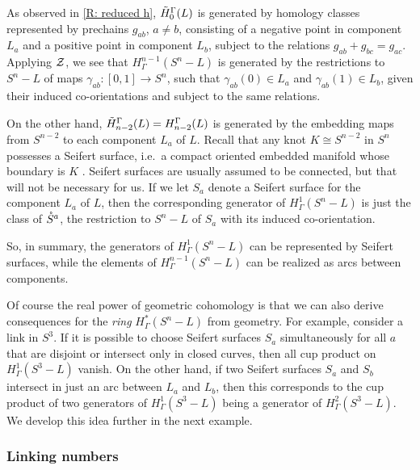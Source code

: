 As observed in \cref{R: reduced h}, $\tilde H_0^\Gamma(L)$ is generated by homology classes represented by prechains $g_{ab}$, $a \neq b$, consisting of a negative point in component $L_a$ and a positive point in component $L_b$, subject to the relations $g_{ab}+g_{bc}=g_{ac}$.
Applying $\mathcal{Z}$, we see that $H^{n-1}_\Gamma(S^n - L)$ is generated by the restrictions to $S^n-L$ of maps $\gamma_{ab} \colon [0,1] \to S^n$, such that $\gamma_{ab}(0) \in L_a$ and $\gamma_{ab}(1) \in L_b$, given their induced co-orientations and subject to the same relations.

On the other hand, $\tilde H_{n-2}^\Gamma(L) = H_{n-2}^\Gamma(L)$ is generated by the embedding maps from $S^{n-2}$ to each component $L_a$ of $L$.
Recall that any knot $K \cong S^{n-2}$ in $S^n$ possesses a Seifert surface, i.e.\ a compact oriented embedded manifold whose boundary is $K$ \cite[Appendix B]{MC17}.
Seifert surfaces are usually assumed to be connected, but that will not be necessary for us.
If we let $S_a$ denote a Seifert surface for the component $L_a$ of $L$, then the corresponding generator of $H^1_\Gamma(S^n - L)$ is just the class of $\mathring{S}^a$, the restriction to $S^n - L$ of $S_a$ with its induced co-orientation.

So, in summary, the generators of $H^1_\Gamma(S^n - L)$ can be represented by Seifert surfaces, while the elements of $H^{n-1}_\Gamma(S^n - L)$ can be realized as arcs between components.

Of course the real power of geometric cohomology is that we can also derive consequences for the {\it ring} $H^*_\Gamma(S^n-L)$ from geometry.
For example, consider a link in $S^3$.
If it is possible to choose Seifert surfaces $S_a$ simultaneously for all $a$ that are disjoint or intersect only in closed curves, then all cup product on $H^1_\Gamma(S^3-L)$ vanish.
On the other hand, if two Seifert surfaces $S_a$ and $S_b$ intersect in just an arc between $L_a$ and $L_b$, then this corresponds to the cup product of two generators of $H^1_\Gamma(S^3-L)$ being a generator of $H^2_\Gamma(S^3-L)$.
We develop this idea further in the next example.

\subsubsection{Linking numbers}

